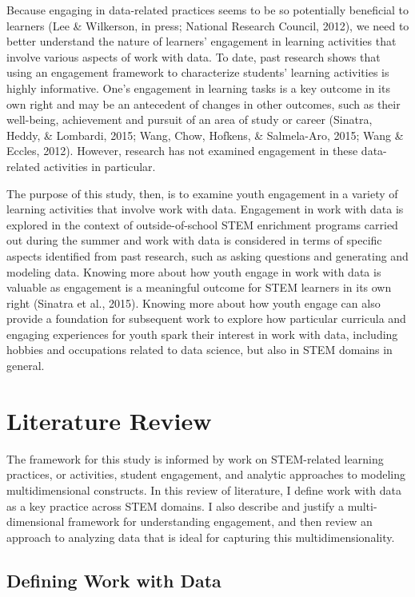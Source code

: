 \documentclass[]{msu-thesis}
\theoremstyle{definition}
\theoremstyle{definition}
\theoremstyle{definition}
\theoremstyle{remark}
\begin{document}
Because engaging in data-related practices seems to be so potentially
beneficial to learners (Lee \& Wilkerson, in press; National Research
Council, 2012), we need to better understand the nature of learners'
engagement in learning activities that involve various aspects of work
with data. To date, past research shows that using an engagement
framework to characterize students' learning activities is highly
informative. One's engagement in learning tasks is a key outcome in its
own right and may be an antecedent of changes in other outcomes, such as
their well-being, achievement and pursuit of an area of study or career
(Sinatra, Heddy, \& Lombardi, 2015; Wang, Chow, Hofkens, \& Salmela-Aro,
2015; Wang \& Eccles, 2012). However, research has not examined
engagement in these data-related activities in particular.

The purpose of this study, then, is to examine youth engagement in a
variety of learning activities that involve work with data. Engagement
in work with data is explored in the context of outside-of-school STEM
enrichment programs carried out during the summer and work with data is
considered in terms of specific aspects identified from past research,
such as asking questions and generating and modeling data. Knowing more
about how youth engage in work with data is valuable as engagement is a
meaningful outcome for STEM learners in its own right (Sinatra et al.,
2015). Knowing more about how youth engage can also provide a foundation
for subsequent work to explore how particular curricula and engaging
experiences for youth spark their interest in work with data, including
hobbies and occupations related to data science, but also in STEM
domains in general.

\chapter{Literature Review}\label{literature-review}

The framework for this study is informed by work on STEM-related
learning practices, or activities, student engagement, and analytic
approaches to modeling multidimensional constructs. In this review of
literature, I define work with data as a key practice across STEM
domains. I also describe and justify a multi-dimensional framework for
understanding engagement, and then review an approach to analyzing data
that is ideal for capturing this multidimensionality.

\section{Defining Work with Data}\label{defining-work-with-data}
\end{document}
